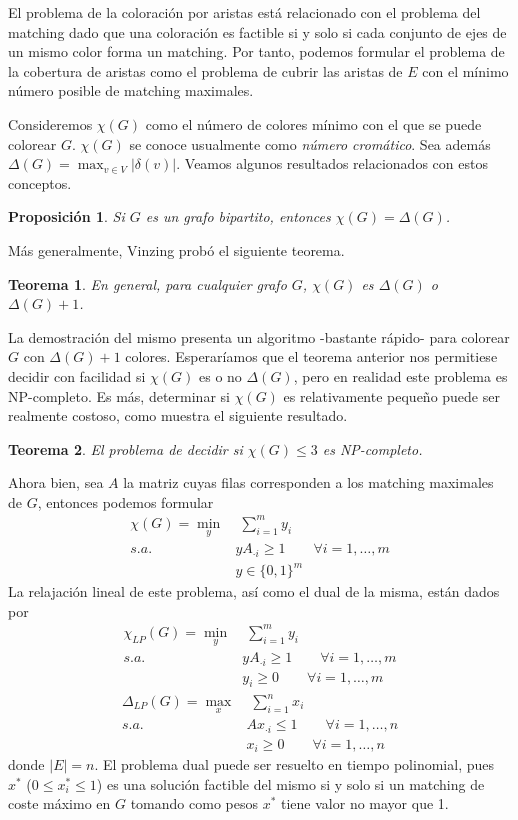 \documentclass[twoside,a4paper,openright,12pt,tikz]{book}
\newtheorem{prop}{Proposici\'on}[section]
\newtheorem{thm}{Teorema}[section]
\begin{document}
El problema de la coloración por aristas está relacionado con el problema del matching dado que una coloración es factible si y solo si cada conjunto de ejes de un mismo color forma un matching. Por tanto, podemos formular el problema de la cobertura de aristas como el problema de cubrir las aristas de $E$ con el mínimo número posible de matching maximales. 

Consideremos $\chi(G)$ como el número de colores mínimo con el que se puede colorear $G$. $\chi(G)$ se conoce usualmente como \textit{número cromático}. Sea además $\Delta(G) = \max_{v\in V} |\delta(v)|$. Veamos algunos resultados relacionados con estos conceptos.
\begin{prop}
Si $G$ es un grafo bipartito, entonces $\chi(G)=\Delta(G)$. 
\end{prop}
Más generalmente, Vinzing probó el siguiente teorema.
\begin{thm}
En general, para cualquier grafo $G$, $\chi(G)$ es $\Delta(G)$ o $\Delta(G)+1$. 
\end{thm}
La demostración del mismo presenta un algoritmo -bastante rápido- para colorear $G$ con $\Delta(G)+1$ colores. Esperaríamos que el teorema anterior nos permitiese decidir con facilidad si $\chi(G)$ es o no $\Delta(G)$, pero en realidad este problema es NP-completo. Es más, determinar si $\chi(G)$ es relativamente pequeño puede ser realmente costoso, como muestra el siguiente resultado.
\begin{thm}
El problema de decidir si $\chi(G)\leq 3$ es NP-completo.
\end{thm}
Ahora bien, sea $A$ la matriz cuyas filas corresponden a los matching maximales de $G$, entonces podemos formular
\begin{align*}
\chi(G)=\min_{y} &\; \sum_{i=1}^m  y_{i}  \nonumber\\ 
s.a.\;  &  yA_{\cdot i} \geq  1 \qquad \forall i=1,\dotsc,m\\
& y\in\{0,1\}^{m}\nonumber
\end{align*}
La relajación lineal de este problema, así como el dual de la misma, están dados por
\begin{align*}
\chi_{LP}(G)=\min_{y} &\; \sum_{i=1}^m  y_{i}  \nonumber\\ 
s.a.\;  &  yA_{\cdot i} \geq  1 \qquad \forall i=1,\dotsc,m\\
& y_i \geq 0  \qquad \forall i=1,\dotsc,m 
\end{align*}
\begin{align*}
\Delta_{LP}(G)=\max_{x} &\; \sum_{i=1}^n  x_i  \nonumber\\ 
s.a.\;  &  Ax_{\cdot i} \leq  1 \qquad \forall i=1,\dotsc,n\\
& x_i\geq 0  \qquad \forall i=1,\dotsc,n
\end{align*}
donde $|E|=n$. El problema dual puede ser resuelto en tiempo polinomial, pues $x^*$ ($0\leq x^*_i \leq 1$) es una solución factible del mismo si y solo si un matching de coste máximo en $G$ tomando como pesos $x^*$ tiene valor no mayor que 1.
\end{document}
